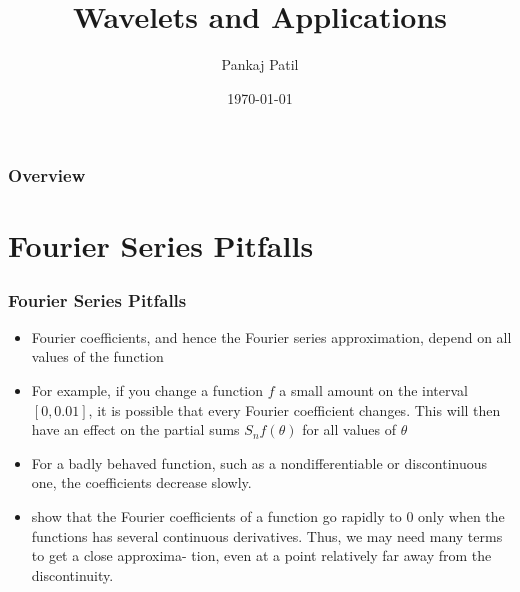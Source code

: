 \documentclass{beamer}
\title[Wavelets Applications]{Wavelets and Applications} %
\author{Pankaj Patil} %
\institute[UOFT] %
{
University of Toronto \\ %
\medskip
\textit{pankaj.patil@mail.utoronto.ca} %
}
\date{\today} %
\begin{document}
\begin{frame}
\titlepage %
\end{frame}

\begin{frame}
\frametitle{Overview} %
\tableofcontents %
\end{frame}


\section{Fourier Series Pitfalls} %

\begin{frame}
\frametitle{Fourier Series Pitfalls}

\begin{itemize}
    \item Fourier coefficients, and hence the Fourier series approximation, depend on all values of the function
    \item For example, if you change a function $f$ a small amount on the interval $[0, 0.01]$, it is possible that every Fourier coefficient changes. This will then have an effect on the partial sums $S_n f (\theta )$ for all values of $\theta$
    \item For a badly behaved function, such as a nondifferentiable or discontinuous one, the coefficients decrease slowly.
    \item show that the Fourier coefficients of a function go rapidly to 0 only when the functions has several continuous derivatives. Thus, we may need many terms to get a close approxima- tion, even at a point relatively far away from the discontinuity.
\end{itemize}

\end{frame}
\end{document}
